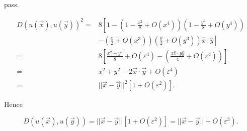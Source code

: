 \ex pass.

\ex $$\begin{aligned}
    D(u(\vec{x}),u(\vec{y}))^2 = & 8\left[1-(1-\frac{x^2}{8}+O(x^4))(1-\frac{y^2}{8}+O(y^4))\right.
    \\ & \left. - (\frac{x}{2}+O(x^3))(\frac{y}{2}+O(y^3))\hat{x}\cdot\hat{y}\right]
    \\ = & 8\left[\frac{x^2+y^2}{8}+O(\varepsilon^4)-(\frac{x\hat{x}\cdot y\hat{y}}{4}+O(\varepsilon^4))\right]
    \\ = & x^2+y^2-2\vec{x}\cdot\vec{y}+O(\varepsilon^4)
    \\ = & ||\vec{x}-\vec{y}||^2[1+O(\varepsilon^2)].
\end{aligned}$$

Hence

$$D(u(\vec{x}),u(\vec{y}))=||\vec{x}-\vec{y}||[1+O(\varepsilon^2)]=||\vec{x}-\vec{y}||+O(\varepsilon^3).$$

\ex \todo

\prob \todo
